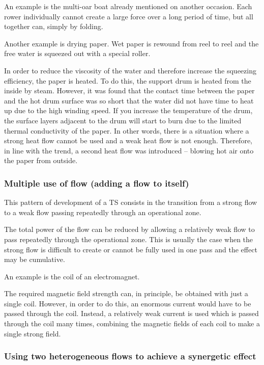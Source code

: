\documentclass[a4paper,11pt]{article}
\begin{document}
An example is the multi-oar boat already mentioned on another occasion. Each
rower individually cannot create a large force over a long period of time, but
all together can, simply by folding.

Another example is drying paper. Wet paper is rewound from reel to reel and
the free water is squeezed out with a special roller.

In order to reduce the viscosity of the water and therefore increase the
squeezing efficiency, the paper is heated. To do this, the support drum is
heated from the inside by steam. However, it was found that the contact time
between the paper and the hot drum surface was so short that the water did not
have time to heat up due to the high winding speed. If you increase the
temperature of the drum, the surface layers adjacent to the drum will start to
burn due to the limited thermal conductivity of the paper. In other words,
there is a situation where a strong heat flow cannot be used and a weak heat
flow is not enough. Therefore, in line with the trend, a second heat flow was
introduced -- blowing hot air onto the paper from outside.

\subsubsection{Multiple use of flow (adding a flow to itself)}

This pattern of development of a TS consists in the transition from a strong
flow to a weak flow passing repeatedly through an operational zone.

The total power of the flow can be reduced by allowing a relatively weak flow
to pass repeatedly through the operational zone. This is usually the case when
the strong flow is difficult to create or cannot be fully used in one pass and
the effect may be cumulative.

An example is the coil of an electromagnet.

The required magnetic field strength can, in principle, be obtained with just
a single coil. However, in order to do this, an enormous current would have to
be passed through the coil. Instead, a relatively weak current is used which
is passed through the coil many times, combining the magnetic fields of each
coil to make a single strong field.

\subsubsection{Using two heterogeneous flows to achieve a synergetic effect} 
\end{document}
